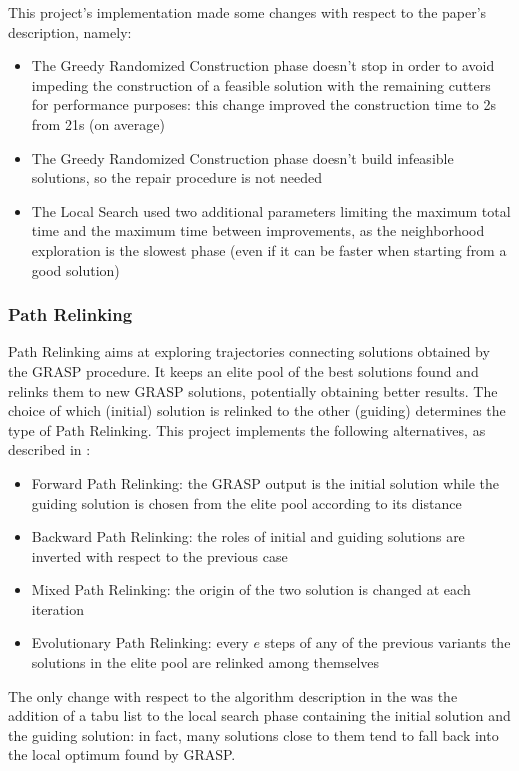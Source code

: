 This project's implementation made some changes with respect to the paper's description, namely:
\begin{itemize}[itemsep=-1mm, topsep=0mm]
	\item The Greedy Randomized Construction phase doesn't stop in order to avoid impeding the construction of a feasible solution with the remaining cutters for performance purposes: this change improved the construction time to 2s from 21s (on average)
	\item The Greedy Randomized Construction phase doesn't build infeasible solutions, so the repair procedure is not needed
	\item The Local Search used two additional parameters limiting the maximum total time and the maximum time between improvements, as the neighborhood exploration is the slowest phase (even if it can be faster when starting from a good solution\cite{local_search})
\end{itemize}

\subsubsection{Path Relinking}
Path Relinking aims at exploring trajectories connecting solutions obtained by the GRASP procedure. It keeps an elite pool of the best solutions found and relinks them to new GRASP solutions, potentially obtaining better results. The choice of which (initial) solution is relinked to the other (guiding) determines the type of Path Relinking. This project implements the following alternatives, as described in \cite{grasp}:
\begin{itemize}[itemsep=-1mm, topsep=0mm]
	\item Forward Path Relinking: the GRASP output is the initial solution while the guiding solution is chosen from the elite pool according to its distance
	\item Backward Path Relinking: the roles of initial and guiding solutions are inverted with respect to the previous case
	\item Mixed Path Relinking: the origin of the two solution is changed at each iteration
	\item Evolutionary Path Relinking: every $e$ steps of any of the previous variants the solutions in the elite pool are relinked among themselves
\end{itemize}
The only change with respect to the algorithm description in the was the addition of a tabu list to the local search phase containing the initial solution and the guiding solution: in fact, many solutions close to them tend to fall back into the local optimum found by GRASP.

